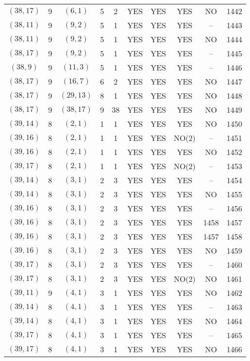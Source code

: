 \begin{longtable}{|c|c|c|c|c|c|c|c|c|c|}
$(38, 17)$ & 9 & $(6, 1)$ & 5 & 2 & YES & YES & YES & NO & 1442\\
$(38, 11)$ & 9 & $(9, 2)$ & 5 & 1 & YES & YES & YES & -- & 1443\\
$(38, 11)$ & 9 & $(9, 2)$ & 5 & 1 & YES & YES & YES & NO & 1444\\
$(38, 17)$ & 9 & $(9, 2)$ & 5 & 1 & YES & YES & YES & -- & 1445\\
$(38, 9)$ & 9 & $(11, 3)$ & 5 & 1 & YES & YES & YES & -- & 1446\\
$(38, 17)$ & 9 & $(16, 7)$ & 6 & 2 & YES & YES & YES & NO & 1447\\
$(38, 17)$ & 9 & $(29, 13)$ & 8 & 1 & YES & YES & YES & NO & 1448\\
$(38, 17)$ & 9 & $(38, 17)$ & 9 & 38 & YES & YES & YES & NO & 1449\\
$(39, 14)$ & 8 & $(2, 1)$ & 1 & 1 & YES & YES & YES & NO & 1450\\
$(39, 16)$ & 8 & $(2, 1)$ & 1 & 1 & YES & YES & NO(2) & -- & 1451\\
$(39, 16)$ & 8 & $(2, 1)$ & 1 & 1 & YES & YES & YES & NO & 1452\\
$(39, 17)$ & 8 & $(2, 1)$ & 1 & 1 & YES & YES & NO(2) & -- & 1453\\
$(39, 14)$ & 8 & $(3, 1)$ & 2 & 3 & YES & YES & YES & -- & 1454\\
$(39, 14)$ & 8 & $(3, 1)$ & 2 & 3 & YES & YES & YES & NO & 1455\\
$(39, 16)$ & 8 & $(3, 1)$ & 2 & 3 & YES & YES & YES & -- & 1456\\
$(39, 16)$ & 8 & $(3, 1)$ & 2 & 3 & YES & YES & YES & 1458 & 1457\\
$(39, 16)$ & 8 & $(3, 1)$ & 2 & 3 & YES & YES & YES & 1457 & 1458\\
$(39, 16)$ & 8 & $(3, 1)$ & 2 & 3 & YES & YES & YES & NO & 1459\\
$(39, 17)$ & 8 & $(3, 1)$ & 2 & 3 & YES & YES & YES & -- & 1460\\
$(39, 17)$ & 8 & $(3, 1)$ & 2 & 3 & YES & YES & NO(2) & NO & 1461\\
$(39, 11)$ & 9 & $(4, 1)$ & 3 & 1 & YES & YES & YES & NO & 1462\\
$(39, 14)$ & 8 & $(4, 1)$ & 3 & 1 & YES & YES & YES & -- & 1463\\
$(39, 14)$ & 8 & $(4, 1)$ & 3 & 1 & YES & YES & YES & NO & 1464\\
$(39, 17)$ & 8 & $(4, 1)$ & 3 & 1 & YES & YES & YES & -- & 1465\\
$(39, 17)$ & 8 & $(4, 1)$ & 3 & 1 & YES & YES & YES & NO & 1466\\

\end{longtable}
